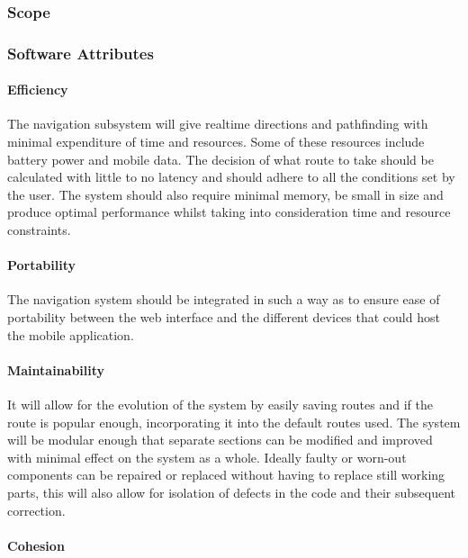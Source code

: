\subsubsection{Scope}


\subsubsection{Software Attributes}

	\paragraph{Efficiency}

	The navigation subsystem will give realtime directions and pathfinding with minimal expenditure of time and resources. Some of these resources include battery power and mobile data. The decision of what route to take should be calculated with little to no latency and should adhere to all the conditions set by the user. The system should also require minimal memory, be small in size and produce optimal performance whilst taking into consideration time and resource constraints.

	\paragraph{Portability}

	The navigation system should be integrated in such a way as to ensure ease of portability between the web interface and the different devices that could host the mobile application. 

	\paragraph{Maintainability}

	It will allow for the evolution of the system by easily saving routes and if the route is popular enough, incorporating it into the default routes used. The system will be modular enough that separate sections can be modified and improved with minimal effect on the system as a whole. Ideally faulty or worn-out components can be repaired or replaced without having to replace still working parts, this will also allow for isolation of defects in the code and their subsequent correction.
	
	\paragraph{Cohesion}

